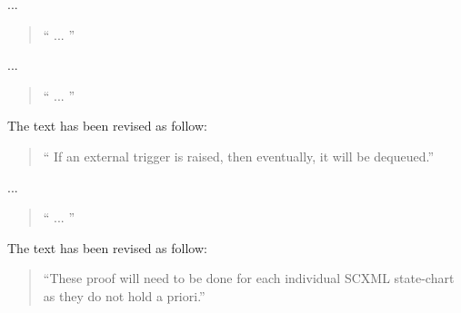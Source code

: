 \documentclass{response}
\begin{document}
\begin{comment}{Reviewer \#1}
• p.22 Could you comment on your definition of anticipated events. Why the set 
of convergent events is necessary to recall just before?
\end{comment}

\begin{response}
  ...
  \begin{quote}
    `` ...
   ''
  \end{quote}
\end{response}

\begin{comment}{Reviewer \#1}
• p.22 Proof of Convergence an Anticipation I wonder if this paragraph should 
not be before because you use such arguments before just after stating Theorem 
2.
\end{comment}

\begin{response}
  ...
  \begin{quote}
    `` ...
   ''
  \end{quote}
\end{response}

\begin{comment}{Reviewer \#1}
• p.23 typo. it will be dequeued.
\end{comment}

\begin{response}
  The text has been revised as follow:
  \begin{quote}
    `` If an external trigger is raised, then eventually, it will be dequeued.''
  \end{quote}
\end{response}

\begin{comment}{Reviewer \#1}
• p. 23 could you explain the square bracket notation, e.g. [externalTrigger.t]
\end{comment}

\begin{response}
  ...
  \begin{quote}
    `` ...
   ''
  \end{quote}
\end{response}


\begin{comment}{Reviewer \#1}
• typo. they do no hold a priori.
\end{comment}

\begin{response}
  The text has been revised as follow:
  \begin{quote}
    ``These proof will need to be done for each individual SCXML state-chart as they do not hold a priori.''
  \end{quote}
\end{response}
\end{document}
